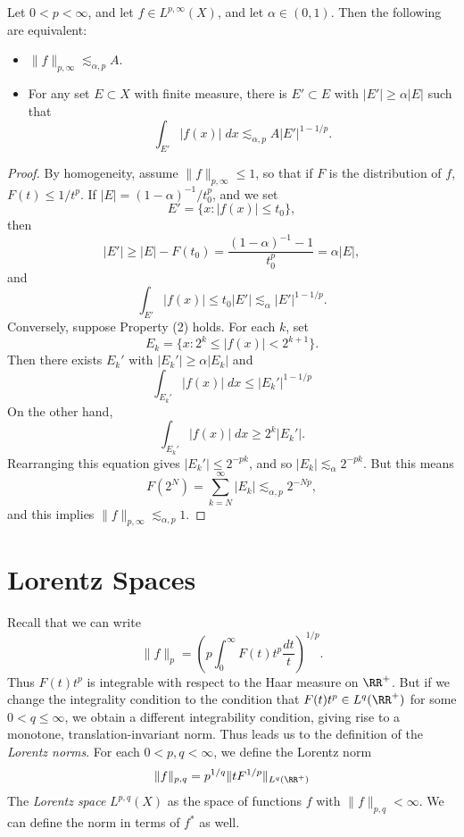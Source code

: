 \begin{theorem} \label{weakdualitytheorem}
  Let $0 < p < \infty$, and let $f \in L^{p,\infty}(X)$, and let $\alpha \in (0,1)$. Then the following are equivalent:
  \begin{itemize}
    \item $\| f \|_{p,\infty} \lesssim_{\alpha,p} A$.

    \item For any set $E \subset X$ with finite measure, there is $E' \subset E$ with $|E'| \geq \alpha |E|$ such that
    \[ \int_{E'} |f(x)|\; dx \lesssim_{\alpha,p} A |E'|^{1 - 1/p}. \]
  \end{itemize}
\end{theorem}
\begin{proof}
  By homogeneity, assume $\| f \|_{p,\infty} \leq 1$, so that if $F$ is the distribution of $f$, $F(t) \leq 1/t^p$. If $|E| = (1-\alpha)^{-1} / t_0^p$, and we set
  \[ E' = \{ x: |f(x)| \leq t_0 \}, \]
  then
  \[ |E'| \geq |E| - F(t_0) = \frac{(1 - \alpha)^{-1} - 1}{t_0^p} = \alpha |E|, \]
  and
  \[ \int_{E'} |f(x)| \leq t_0 |E'| \lesssim_\alpha |E'|^{1-1/p}. \]
  Conversely, suppose Property (2) holds. For each $k$, set
  \[ E_k = \{ x: 2^k \leq |f(x)| < 2^{k+1} \}. \]
  Then there exists $E_k'$ with $|E_k'| \geq \alpha |E_k|$ and
  \[ \int_{E_k'} |f(x)|\; dx \leq |E_k'|^{1 - 1/p} \]
  On the other hand,
  \[ \int_{E_k'} |f(x)|\; dx \geq 2^k |E_k'|. \]
  Rearranging this equation gives $|E_k'| \leq 2^{-pk}$, and so $|E_k| \lesssim_\alpha 2^{-pk}$. But this means
  \[ F(2^N) = \sum_{k = N}^\infty |E_k| \lesssim_{\alpha,p} 2^{-Np}, \]
  and this implies $\| f \|_{p,\infty} \lesssim_{\alpha,p} 1$.
\end{proof}

\section{Lorentz Spaces}

Recall that we can write
%
\[ \| f \|_p = \left( p \int_0^\infty F(t) t^p \frac{dt}{t} \right)^{1/p}. \]
%
Thus $F(t) t^p$ is integrable with respect to the Haar measure on $\RR^+$. But if we change the integrality condition to the condition that $F(t) t^p \in L^q(\RR^+)$ for some $0 < q \leq \infty$, we obtain a different integrability condition, giving rise to a monotone, translation-invariant norm. Thus leads us to the definition of the \emph{Lorentz norms}. For each $0 < p,q < \infty$, we define the Lorentz norm
%
\[ \| f \|_{p,q} = p^{1/q} \| t F^{1/p} \|_{L^q(\RR^+)} \]
%
The \emph{Lorentz space} $L^{p,q}(X)$ as the space of functions $f$ with $\| f \|_{p,q} < \infty$. We can define the norm in terms of $f^*$ as well.


